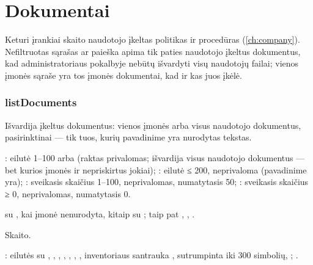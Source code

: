 \section{Dokumentai}\label{sec:tools:documents}

Keturi įrankiai skaito naudotojo įkeltas politikas ir procedūras (\cref{ch:company}).
Nefiltruotas sąrašas ar paieška apima tik paties naudotojo įkeltus dokumentus, kad
administratoriaus pokalbyje nebūtų išvardyti visų naudotojų failai; vienos įmonės sąraše yra tos
įmonės dokumentai, kad ir kas juos įkėlė.

\subsubsection{listDocuments}\label{sec:tools:listDocuments}
\begin{description}[style=multiline, leftmargin=19mm, labelwidth=17mm, labelsep=2mm,
  font=\sffamily\bfseries\footnotesize\color{ink}, itemsep=1pt, topsep=2pt, before=\raggedright]
  \item[Paskirtis] Išvardija įkeltus dokumentus: vienos įmonės arba visus naudotojo dokumentus,
    pasirinktinai --- tik tuos, kurių pavadinime yra nurodytas tekstas.
  \item[Įvestis] : eilutė 1--100 arba  (raktas privalomas;
     išvardija visus naudotojo dokumentus --- bet kurios įmonės ir nepriskirtus
    jokiai); : eilutė ≤ 200,
    neprivaloma (pavadinime yra); : sveikasis skaičius 1--100, neprivalomas,
    numatytasis 50; : sveikasis skaičius ≥ 0, neprivalomas, numatytasis 0.
  \item[Užklausos]  su , kai įmonė nenurodyta,
    kitaip su ; taip pat , , .
  \item[Pobūdis] Skaito.
  \item[Grąžina] : eilutės su , , ,
    , , , ,
    inventoriaus santrauka , sutrumpinta iki 300 simbolių, ;
    .
\end{description}

